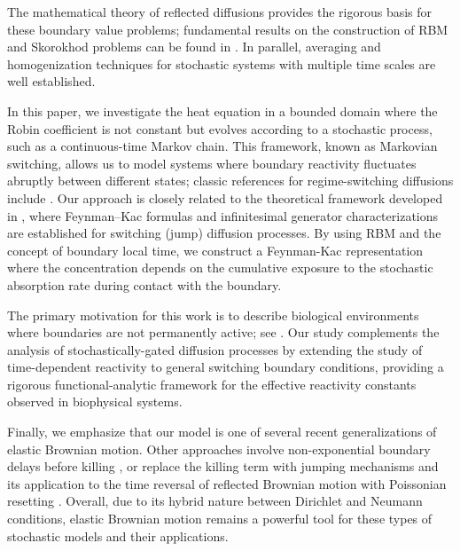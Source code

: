 \documentclass[11pt]{amsart}
\theoremstyle{plain}
\theoremstyle{definition}
\theoremstyle{remark}
\begin{document}
The mathematical theory of reflected diffusions provides the rigorous basis for these boundary value problems; fundamental results on the construction of RBM and Skorokhod problems can be found in \cite{LionsSznitman1984}. In parallel, averaging and homogenization techniques for stochastic systems with multiple time scales are well established. %

In this paper, we investigate the heat equation in a bounded domain where the Robin coefficient is not constant but evolves according to a stochastic process, such as a continuous-time Markov chain. This framework, known as Markovian switching, allows us to model systems where boundary reactivity fluctuates abruptly between different states; classic references for regime-switching diffusions include \cite{Mao2000, Mao2006}. Our approach is closely related to the theoretical framework developed in \cite{ZhuYinBaran2015, Ocejo2020, WeiWangNane2025}, where Feynman–Kac formulas and infinitesimal generator characterizations are established for switching (jump) diffusion processes. By using RBM and the concept of boundary local time, we construct a Feynman-Kac representation where the concentration depends on the cumulative exposure to the stochastic absorption rate during contact with the boundary.

The primary motivation for this work is to describe biological environments where boundaries are not permanently active; see \cite{BergPurcell1977, Szabo1982, Zwanzig1990}. Our study complements the analysis of stochastically-gated diffusion processes \cite{Bressloff2015} by extending the study of time-dependent reactivity to general switching boundary conditions, providing a rigorous functional-analytic framework for the effective reactivity constants observed in biophysical systems.

Finally, we emphasize that our model is one of several recent generalizations of elastic Brownian motion. Other approaches involve non-exponential boundary delays before killing \cite{DovidioFCAA, Dovidio2024}, or replace the killing term with jumping mechanisms \cite{Arendt2018, ColantoniDovidio2025} and its application to the time reversal of reflected Brownian motion with Poissonian resetting \cite{ColantoniDOvidioPagnini2025}. Overall, due to its hybrid nature between Dirichlet and Neumann conditions, elastic Brownian motion remains a powerful tool for these types of stochastic models and their applications.
\end{document}
